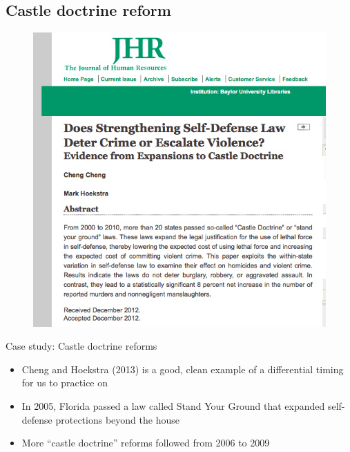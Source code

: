 \documentclass{beamer}
\begin{document}
\subsection{Castle doctrine reform}


\begin{frame}[plain]
	\begin{figure}
	\includegraphics[scale=0.5]{./lecture_includes/cheng_and_hoekstra_jhr.png}
	\end{figure}

\end{frame}

\begin{frame}{Case study: Castle doctrine reforms}

\begin{itemize}

\item Cheng and Hoekstra (2013) is a good, clean example of a differential timing for us to practice on
\item In 2005, Florida passed a law called Stand Your Ground that expanded self-defense protections beyond the house
\item More ``castle doctrine'' reforms followed from 2006 to 2009

\end{itemize}

\end{frame}
\end{document}
